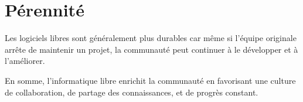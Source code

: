 \section{Pérennité}
Les logiciels libres sont généralement plus durables car même si l'équipe originale arrête de maintenir un projet, la communauté peut continuer à le développer et à l'améliorer.

En somme, l'informatique libre enrichit la communauté en favorisant une culture de collaboration, de partage des connaissances, et de progrès constant.

